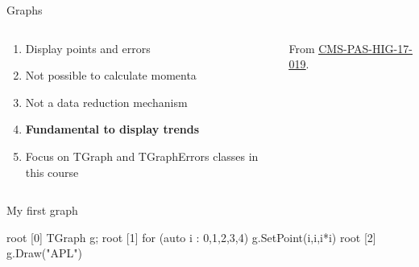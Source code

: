 \documentclass[aspectratio=169]{beamer}
\newcommand{\myfigure}[2]{
    \begin{figure}
        \makebox[\textwidth]{%
            \texttt{[image: \#2]}
        }
    \end{figure}
}
\newcommand{\myhref}[2]{{\color{blue}\href{#1}{\underline{#2}}}}
\begin{document}
\begin{frame}{Graphs}
    \begin{columns}
        \begin{column}{0.5\textwidth}
            \begin{enumerate}
                \item Display points and errors
                \item Not possible to calculate momenta
                \item Not a data reduction mechanism
                \item \textbf{Fundamental to display trends}
                \item Focus on TGraph and TGraphErrors classes in this course
            \end{enumerate}
        \end{column}
        \begin{column}{0.5\textwidth}
            \myfigure{1.00}{Figure_005-a.pdf}
            \begin{center}
                {\small From \myhref{https://cds.cern.ch/record/2292159/}{CMS-PAS-HIG-17-019}.}
            \end{center}
        \end{column}
    \end{columns}
\end{frame}

\begin{frame}[fragile]{My first graph}


    \begin{myterminal}
root [0] TGraph g;
root [1] for (auto i : {0,1,2,3,4}) g.SetPoint(i,i,i*i)
root [2] g.Draw("APL")
    \end{myterminal}

    \myfigure{0.45}{figure-004.pdf}

\end{frame}
\end{document}

